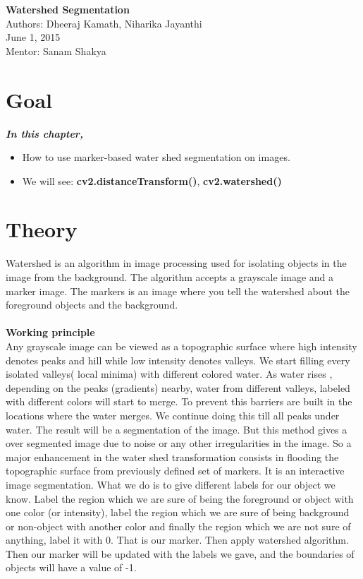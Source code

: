 \documentclass[]{article}
\date{}
\begin{document}
	
\begin{titlepage}
	\centering	
	\huge \textbf{Watershed Segmentation} \\
	\large
	Authors: Dheeraj Kamath, Niharika Jayanthi \\
	June 1, 2015 \\
	Mentor: Sanam Shakya \\
			
\end{titlepage}

\section{Goal}\label{goal}

\emph{\textbf{\large In this chapter,}} 
\begin{itemize} 
	\Large
	\item How to use marker-based water shed segmentation on images.
    \item  We will see: \textbf{cv2.distanceTransform()}, \textbf{cv2.watershed()}
\end{itemize}

\section{Theory}\label{theory}
\Large
Watershed is an algorithm in image processing used for isolating objects in the image from the background. The algorithm accepts a grayscale image and a marker image. The markers is an image where you tell the watershed about the foreground objects and the background. \\
\\
\Large{\textbf{Working principle}} \\
Any grayscale image can be viewed as a topographic surface where high intensity denotes peaks and hill while low intensity denotes valleys. We start filling every isolated valleys( local minima) with different colored water. As water rises , depending on the peaks (gradients) nearby, water from different valleys, labeled with different colors will start to merge. To prevent this barriers are built in the locations where the water merges. We continue doing this till all peaks under water. The result will be a segmentation of the image. But this method gives a over segmented image due to noise or any other irregularities in the image. So a major enhancement in the water shed transformation consists in flooding the topographic surface from previously defined set of markers. It is an interactive image segmentation.
What we do is to give different labels for our object we know. Label the region which we are sure of being the foreground or object with one color (or intensity), label the region which we are sure of being background or non-object with another color and finally the region which we are not sure of anything, label it with 0. That is our marker. Then apply watershed algorithm. Then our marker will be updated with the labels we gave, and the boundaries of objects will have a value of -1.
\end{document}
